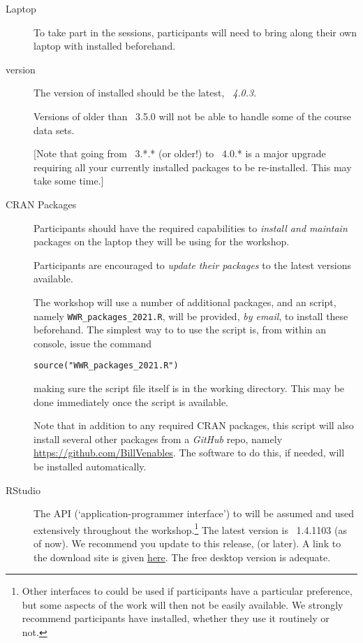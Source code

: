 \documentclass[12pt]{article}
\begin{document}
\begin{description}
\item[Laptop] To take part in the sessions, participants will need to
  bring along their own laptop with \R installed beforehand.
  
\item[\R version] The version of \R installed should be the latest,
  \emph{\R~4.0.3}.

  Versions of \R older than \R~3.5.0 will not be able to
  handle some of the course data sets.

  [Note that going from \R~3.*.* (or older!) to \R~4.0.* is a major
  upgrade requiring all your currently installed packages to be
  re-installed. This may take some time.]

\item[CRAN Packages] Participants should have the required
  capabilities to \emph{install and maintain} \R packages on the
  laptop they will be using for the workshop.

  Participants are encouraged to \emph{update their packages} to the
  latest versions available.

  The workshop will use a number of additional \R packages, and
  an \R script, namely \verb|WWR_packages_2021.R|, will be provided,
  \emph{by email}, to install these beforehand. The simplest way to
  to use the script is, from within an \R console, issue the command

  \verb|source("WWR_packages_2021.R")|

  making sure the script file itself is in the \R working directory.
  This may be done immediately once the script is available.

  Note that in addition to any required CRAN packages, this script
  will also install several other packages from a \emph{GitHub} repo,
  namely \url{https://github.com/BillVenables}.  The software to do
  this, if needed, will be installed automatically.

  
\item[RStudio] The \RStudio API (`application-programmer interface')
  to \R will be assumed and used extensively throughout the
  workshop.\footnote{Other interfaces to \R could be used if
    participants have a particular preference, but some aspects of the
    work will then not be easily available.  We strongly recommend
    participants have \RStudio installed, whether they use it
    routinely or not.}  The latest version is
  \hbox{\RStudio}~1.4.1103 (as of now).  We recommend you update to this release, (or
  later).  A link to the download site is given
  \href{https://rstudio.com/products/rstudio/download/}{here}. The
  free desktop version is adequate.  


\end{description}
\end{document}
